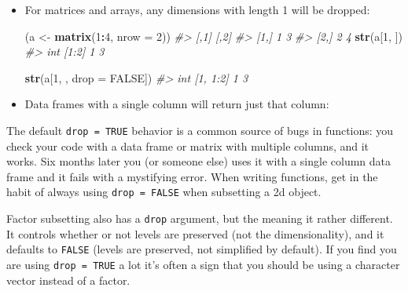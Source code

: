 \documentclass[]{book}
\newenvironment{Shaded}{\begin{snugshade}}{\end{snugshade}}
\newcommand{\KeywordTok}[1]{\textcolor[rgb]{0.13,0.29,0.53}{\textbf{#1}}}
\newcommand{\DataTypeTok}[1]{\textcolor[rgb]{0.13,0.29,0.53}{#1}}
\newcommand{\DecValTok}[1]{\textcolor[rgb]{0.00,0.00,0.81}{#1}}
\newcommand{\StringTok}[1]{\textcolor[rgb]{0.31,0.60,0.02}{#1}}
\newcommand{\CommentTok}[1]{\textcolor[rgb]{0.56,0.35,0.01}{\textit{#1}}}
\newcommand{\OtherTok}[1]{\textcolor[rgb]{0.56,0.35,0.01}{#1}}
\newcommand{\OperatorTok}[1]{\textcolor[rgb]{0.81,0.36,0.00}{\textbf{#1}}}
\newcommand{\NormalTok}[1]{#1}
\theoremstyle{definition}
\theoremstyle{definition}
\theoremstyle{definition}
\theoremstyle{remark}
\begin{document}
\begin{itemize}
\item
  For matrices and arrays, any dimensions with length 1 will be dropped:

\begin{Shaded}
\begin{Highlighting}[]
\NormalTok{(a <-}\StringTok{ }\KeywordTok{matrix}\NormalTok{(}\DecValTok{1}\OperatorTok{:}\DecValTok{4}\NormalTok{, }\DataTypeTok{nrow =} \DecValTok{2}\NormalTok{))}
\CommentTok{#>      [,1] [,2]}
\CommentTok{#> [1,]    1    3}
\CommentTok{#> [2,]    2    4}
\KeywordTok{str}\NormalTok{(a[}\DecValTok{1}\NormalTok{, ])}
\CommentTok{#>  int [1:2] 1 3}

\KeywordTok{str}\NormalTok{(a[}\DecValTok{1}\NormalTok{, , }\DataTypeTok{drop =} \OtherTok{FALSE}\NormalTok{])}
\CommentTok{#>  int [1, 1:2] 1 3}
\end{Highlighting}
\end{Shaded}
\item
  Data frames with a single column will return just that column:

\begin{Shaded}
\end{Shaded}
\end{itemize}

The default \texttt{drop\ =\ TRUE} behavior is a common source of bugs
in functions: you check your code with a data frame or matrix with
multiple columns, and it works. Six months later you (or someone else)
uses it with a single column data frame and it fails with a mystifying
error. When writing functions, get in the habit of always using
\texttt{drop\ =\ FALSE} when subsetting a 2d object.

Factor subsetting also has a \texttt{drop} argument, but the meaning it
rather different. It controls whether or not levels are preserved (not
the dimensionality), and it defaults to \texttt{FALSE} (levels are
preserved, not simplified by default). If you find you are using
\texttt{drop\ =\ TRUE} a lot it's often a sign that you should be using
a character vector instead of a factor.
\end{document}
